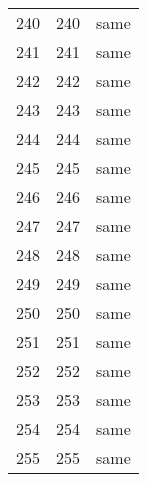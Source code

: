 \documentclass{article}%
\begin{document}
\begin{longtable}{lrl}
240 &  240 &  same \\
241 &  241 &  same \\
242 &  242 &  same \\
243 &  243 &  same \\
244 &  244 &  same \\
245 &  245 &  same \\
246 &  246 &  same \\
247 &  247 &  same \\
248 &  248 &  same \\
249 &  249 &  same \\
250 &  250 &  same \\
251 &  251 &  same \\
252 &  252 &  same \\
253 &  253 &  same \\
254 &  254 &  same \\
255 &  255 &  same \\
\end{longtable}

%
\end{document}
